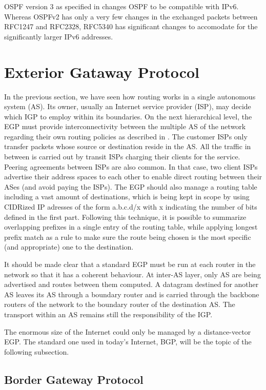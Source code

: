 \documentclass{acm_proc_article-sp}
\begin{document}
OSPF version 3 as specified in \cite{RFC5340} changes OSPF to be compatible with IPv6. Whereas OSPFv2 has only a very few changes in the exchanged packets between RFC1247 and RFC2328, RFC5340 has significant changes to accomodate for the significantly larger IPv6 addresses.

\section{Exterior Gataway Protocol}

In the previous section, we have seen how routing works in a single autonomous system (AS). Its owner, usually an Internet service provider (ISP), may decide which IGP to employ within its boundaries. On the next hierarchical level, the EGP must provide interconnectivity between the multiple AS of the network regarding their own routing policies as described in \cite{tanenbaum}. The customer ISPs only transfer packets whose source or destination reside in the AS. All the traffic in between is carried out by transit ISPs charging their clients for the service. Peering agreements between ISPs are also common. In that case, two client ISPs advertise their address spaces to each other to enable direct routing between their ASes (and avoid paying the ISPs). The EGP should also manage a routing table including a vast amount of destinations, which is being kept in scope by using CIDRized IP adresses of the form a.b.c.d/x with x indicating the number of bits defined in the first part. Following this technique, it is possible to summarize overlapping prefixes in a single entry of the routing table, while applying longest prefix match as a rule to make sure the route being chosen is the most specific (and appropriate) one to the destination.

It should be made clear that a standard EGP must be run at each router in the network so that it has a coherent behaviour. At inter-AS layer, only AS are being advertised and routes between them computed. A datagram destined for another AS leaves its AS through a boundary router and is carried through the backbone routers of the network to the boundary router of the destination AS. The transport within an AS remains still the responsibility of the IGP.

The enormous size of the Internet could only be managed by a distance-vector EGP. The standard one used in today's Internet, BGP, will be the topic of the following subsection. 

\subsection{Border Gateway Protocol}
\end{document}

